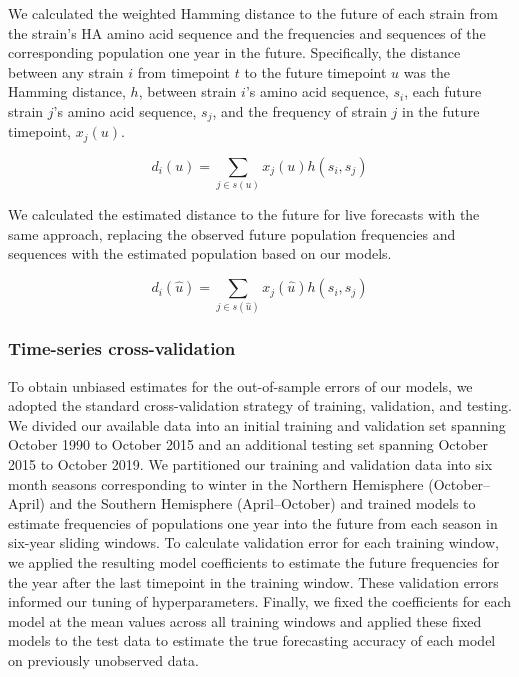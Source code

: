 We calculated the weighted Hamming distance to the future of each strain from the strain's HA amino acid sequence and the frequencies and sequences of the corresponding population one year in the future.
Specifically, the distance between any strain $i$ from timepoint $t$ to the future timepoint $u$ was the Hamming distance, $h$, between strain $i$'s amino acid sequence, $s_{i}$, each future strain $j$'s amino acid sequence, $s_{j}$, and the frequency of strain $j$ in the future timepoint, $x_{j}(u)$.

\begin{equation}
  d_{i}(u) = \sum_{j \in s(u)}{x_{j}(u)h(s_{i}, s_{j})}
  \label{equation_observed_weighted_distance_to_future}
\end{equation}

We calculated the estimated distance to the future for live forecasts with the same approach, replacing the observed future population frequencies and sequences with the estimated population based on our models.

\begin{equation}
  d_{i}(\hat{u}) = \sum_{j \in s(\hat{u})}{x_{j}(\hat{u})h(s_{i}, s_{j})}
  \label{equation_estimated_weighted_distance_to_future}
\end{equation}

\subsubsection*{Time-series cross-validation}

To obtain unbiased estimates for the out-of-sample errors of our models, we adopted the standard cross-validation strategy of training, validation, and testing.
We divided our available data into an initial training and validation set spanning October 1990 to October 2015 and an additional testing set spanning October 2015 to October 2019.
We partitioned our training and validation data into six month seasons corresponding to winter in the Northern Hemisphere (October--April) and the Southern Hemisphere (April--October) and trained models to estimate frequencies of populations one year into the future from each season in six-year sliding windows.
To calculate validation error for each training window, we applied the resulting model coefficients to estimate the future frequencies for the year after the last timepoint in the training window.
These validation errors informed our tuning of hyperparameters.
Finally, we fixed the coefficients for each model at the mean values across all training windows and applied these fixed models to the test data to estimate the true forecasting accuracy of each model on previously unobserved data.

